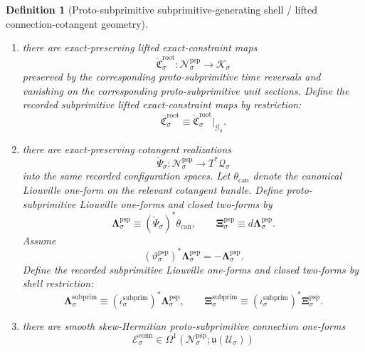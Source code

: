 \documentclass[11pt]{article}
\newcommand{\LieU}{\mathfrak u}
\newcommand{\RootClass}[1]{\mathscr U_{#1}}
\newcommand{\ConfigSpace}[1]{\mathcal Q_{#1}}
\newcommand{\ShellGap}[1]{\eta_{#1}}
\newcommand{\ConstraintTarget}[1]{\mathcal K_{#1}}
\newcommand{\SubprimSpace}[1]{\mathcal G_{#1}}
\newcommand{\SubprimInc}[1]{\iota_{#1}^{\mathrm{subprim}}}
\newcommand{\SubprimConstraintMap}[1]{\overline{\mathfrak C}_{#1}^{\mathrm{root}}}
\newcommand{\SubprimLiouville}[1]{\boldsymbol{\Lambda}_{#1}^{\mathrm{subprim}}}
\newcommand{\SubprimTwo}[1]{\boldsymbol{\Xi}_{#1}^{\mathrm{subprim}}}
\newcommand{\ProtoSubprimSpace}[1]{\mathcal N_{#1}^{\mathrm{psp}}}
\newcommand{\ProtoSubprimTimeRev}[1]{\vartheta_{#1}^{\mathrm{psp}}}
\newcommand{\ProtoSubprimConstraintMap}[1]{\check{\mathfrak C}_{#1}^{\mathrm{root}}}
\newcommand{\ProtoSubprimCotangentRealization}[1]{\check{\Psi}_{#1}}
\newcommand{\ProtoSubprimLiouville}[1]{\boldsymbol{\Lambda}_{#1}^{\mathrm{psp}}}
\newcommand{\ProtoSubprimTwo}[1]{\boldsymbol{\Xi}_{#1}^{\mathrm{psp}}}
\newcommand{\ProtoSubprimConnectionForm}[1]{\mathcal E_{#1}^{\mathrm{conn}}}
\newtheorem{definition}{Definition}
\begin{document}
\begin{definition}[Proto-subprimitive subprimitive-generating shell / lifted connection-cotangent geometry]
\begin{enumerate}
\begin{equation}
    \label{eq:subprimitive_shell_map_from_protosubprimitive}
    \end{equation}
    Assume these restricted maps satisfy the same recorded positive shell-gap bounds \(\ShellGap{\sigma}>0\) on the current seed shells cut out inside \(\SubprimSpace{\sigma}\).
    \item there are exact-preserving lifted exact-constraint maps
    \[
    \ProtoSubprimConstraintMap{\sigma}:\ProtoSubprimSpace{\sigma}\to\ConstraintTarget{\sigma}
    \]
    preserved by the corresponding proto-subprimitive time reversals and vanishing on the corresponding proto-subprimitive unit sections. Define the recorded subprimitive lifted exact-constraint maps by restriction:
    \begin{equation}
    \SubprimConstraintMap{\sigma}\equiv \ProtoSubprimConstraintMap{\sigma}|_{\SubprimSpace{\sigma}}.
    \label{eq:subprimitive_constraint_from_protosubprimitive}
    \end{equation}
    \item there are exact-preserving cotangent realizations
    \[
    \ProtoSubprimCotangentRealization{\sigma}:\ProtoSubprimSpace{\sigma}\to T^*\ConfigSpace{\sigma}
    \]
    into the same recorded configuration spaces. Let \(\theta_{\mathrm{can}}\) denote the canonical Liouville one-form on the relevant cotangent bundle. Define proto-subprimitive Liouville one-forms and closed two-forms by
    \begin{equation}
    \ProtoSubprimLiouville{\sigma}\equiv (\ProtoSubprimCotangentRealization{\sigma})^*\theta_{\mathrm{can}},
    \qquad
    \ProtoSubprimTwo{\sigma}\equiv d\ProtoSubprimLiouville{\sigma}.
    \label{eq:protosubprimitive_liouville}
    \end{equation}
    Assume
    \[
    (\ProtoSubprimTimeRev{\sigma})^*\ProtoSubprimLiouville{\sigma}
    =
    -\ProtoSubprimLiouville{\sigma}.
    \]
    Define the recorded subprimitive Liouville one-forms and closed two-forms by shell restriction:
    \begin{equation}
    \SubprimLiouville{\sigma}\equiv (\SubprimInc{\sigma})^*\ProtoSubprimLiouville{\sigma},
    \qquad
    \SubprimTwo{\sigma}\equiv (\SubprimInc{\sigma})^*\ProtoSubprimTwo{\sigma}.
    \label{eq:subprimitive_liouville_from_protosubprimitive}
    \end{equation}
    \item there are smooth skew-Hermitian proto-subprimitive connection one-forms
    \[
    \ProtoSubprimConnectionForm{\sigma}\in \Omega^1(\ProtoSubprimSpace{\sigma};\LieU(\RootClass{\sigma}))
\]
\end{enumerate}
\end{definition}
\end{document}
